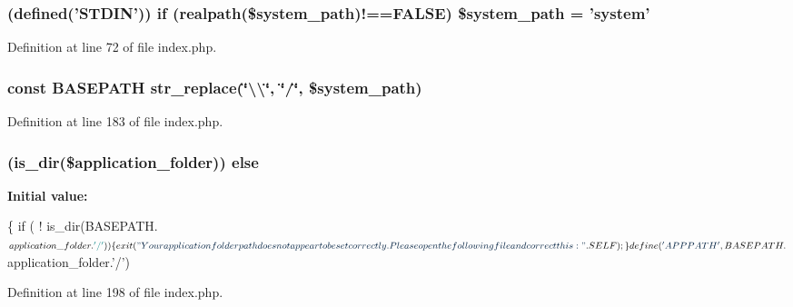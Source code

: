 \subsubsection[{\$system\-\_\-path}]{ (defined('S\-T\-D\-I\-N')) {\bf if} (realpath(\$system\-\_\-path)!==F\-A\-L\-S\-E) \$system\-\_\-path = 'system'}\label{index_8php_ae873e5430c828eb3081abe7050a379b6}


Definition at line 72 of file index.\-php.

\subsubsection[{B\-A\-S\-E\-P\-A\-T\-H}]{\setlength{\rightskip}{0pt plus 5cm}const B\-A\-S\-E\-P\-A\-T\-H str\-\_\-replace(\char`\"{}\textbackslash{}\textbackslash{}\char`\"{}, \char`\"{}/\char`\"{}, \$system\-\_\-path)}\label{index_8php_ad39801cabfd338dc5524466fe793fda9}


Definition at line 183 of file index.\-php.

\subsubsection[{else}]{ (is\-\_\-dir(\$application\-\_\-folder)) else}\label{index_8php_a949e0a4a1cdea0279f54348f205f993b}
{\bfseries Initial value\-:}
\begin{DoxyCode}
\{
        \textcolor{keywordflow}{if} ( ! is\_dir(BASEPATH.$application\_folder.\textcolor{charliteral}{'/'}))
        \{
            exit(\textcolor{stringliteral}{"Your application folder path does not appear to be set correctly. Please open the
       following file and correct this: "}.SELF);
        \}

        define(\textcolor{stringliteral}{'APPPATH'}, BASEPATH.$application\_folder.\textcolor{charliteral}{'/'})
\end{DoxyCode}


Definition at line 198 of file index.\-php.

